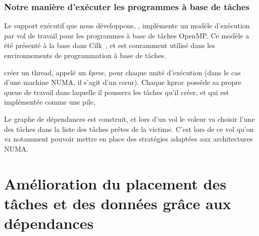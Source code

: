 \documentclass[parallelisme]{compas2016}
\begin{document}




\subsubsection{Notre manière d'exécuter les programmes à base de tâches}

Le support exécutif que nous développons, \kaapi, implémente un modèle d'exécution par vol
de travail pour les programmes à base de tâches OpenMP. Ce modèle a été présenté
à la base dans Cilk~\cite{cilk5}, et est couramment utilisé dans les environnements
de programmation à base de tâches.

\kaapi créer un thread, appelé un \emph{kproc}, pour chaque unité d'exécution
(dans le cas d'une machine NUMA, il s'agit d'un cœur).
Chaque kproc possède sa propre queue de travail dans laquelle il poussera les
tâches qu'il créer, et qui est implémentée comme une pile,

Le graphe de dépendances est construit, et lors d'un vol le voleur va choisir
l'une des tâches dans la liste des tâches prêtes de la victime.
C'est lors de ce vol qu'on va notamment pouvoir mettre en place des stratégies
adaptées aux architectures NUMA.




\section{Amélioration du placement des tâches et des données grâce aux dépendances}
\label{sec:contributions}
\end{document}
